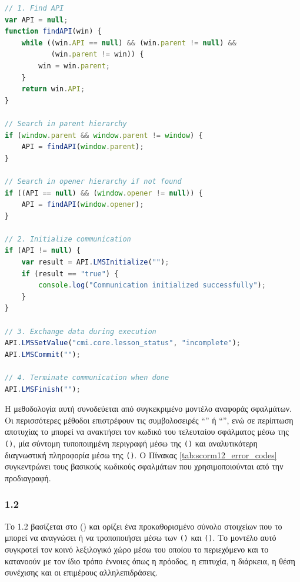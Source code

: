 {\selectfont
\begin{lstlisting}[language=JavaScript, caption={Βασικό \ENG{SCORM} 1.2 \ENG{Communication} \ENG{Pattern}}, label={lst:scorm12_basic_comm}]
// 1. Find API
var API = null;
function findAPI(win) {
    while ((win.API == null) && (win.parent != null) && 
           (win.parent != win)) {
        win = win.parent;
    }
    return win.API;
}

// Search in parent hierarchy
if (window.parent && window.parent != window) {
    API = findAPI(window.parent);
}

// Search in opener hierarchy if not found
if ((API == null) && (window.opener != null)) {
    API = findAPI(window.opener);
}

// 2. Initialize communication
if (API != null) {
    var result = API.LMSInitialize("");
    if (result == "true") {
        console.log("Communication initialized successfully");
    }
}

// 3. Exchange data during execution
API.LMSSetValue("cmi.core.lesson_status", "incomplete");
API.LMSCommit("");

// 4. Terminate communication when done
API.LMSFinish("");
\end{lstlisting}
}

Η μεθοδολογία αυτή συνοδεύεται από συγκεκριμένο μοντέλο αναφοράς σφαλμάτων. Οι περισσότερες μέθοδοι επιστρέφουν τις συμβολοσειρές ``'' ή ``'', ενώ σε περίπτωση αποτυχίας το  μπορεί να ανακτήσει τον κωδικό του τελευταίου σφάλματος μέσω της \texttt{()}, μία σύντομη τυποποιημένη περιγραφή μέσω της \texttt{()} και αναλυτικότερη διαγνωστική πληροφορία μέσω της \texttt{()}. Ο Πίνακας \ref{tab:scorm12_error_codes} συγκεντρώνει τους βασικούς κωδικούς σφαλμάτων που χρησιμοποιούνται από την προδιαγραφή.



\subsubsection{ 1.2  }

Το  1.2  βασίζεται στο  () και ορίζει ένα προκαθορισμένο σύνολο στοιχείων που το  μπορεί να αναγνώσει ή να τροποποιήσει μέσω των \texttt{()} και \texttt{()}. Το μοντέλο αυτό συγκροτεί τον κοινό λεξιλογικό χώρο μέσω του οποίου το περιεχόμενο και το  κατανοούν με τον ίδιο τρόπο έννοιες όπως η πρόοδος, η επιτυχία, η διάρκεια, η θέση συνέχισης και οι επιμέρους αλληλεπιδράσεις.

